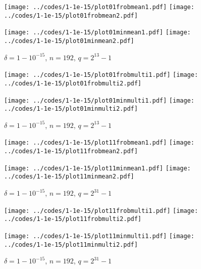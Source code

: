 \documentclass{article}
\begin{document}
\begin{figure}
\begin{centering}
{\texttt{[image: ../codes/1-1e-15/plot01frobmean1.pdf]}}
{\texttt{[image: ../codes/1-1e-15/plot01frobmean2.pdf]}}

{\texttt{[image: ../codes/1-1e-15/plot01minmean1.pdf]}}
{\texttt{[image: ../codes/1-1e-15/plot01minmean2.pdf]}}

\end{centering}
\caption{$\delta = 1-10^{-15}$, $n = 192$, $q = 2^{13} - 1$}
\end{figure}

\begin{figure}
\begin{centering}
{\texttt{[image: ../codes/1-1e-15/plot01frobmulti1.pdf]}}
{\texttt{[image: ../codes/1-1e-15/plot01frobmulti2.pdf]}}

{\texttt{[image: ../codes/1-1e-15/plot01minmulti1.pdf]}}
{\texttt{[image: ../codes/1-1e-15/plot01minmulti2.pdf]}}

\end{centering}
\caption{$\delta = 1-10^{-15}$, $n = 192$, $q = 2^{13} - 1$}
\end{figure}

\begin{figure}
\begin{centering}
{\texttt{[image: ../codes/1-1e-15/plot11frobmean1.pdf]}}
{\texttt{[image: ../codes/1-1e-15/plot11frobmean2.pdf]}}

{\texttt{[image: ../codes/1-1e-15/plot11minmean1.pdf]}}
{\texttt{[image: ../codes/1-1e-15/plot11minmean2.pdf]}}

\end{centering}
\caption{$\delta = 1-10^{-15}$, $n = 192$, $q = 2^{31} - 1$}
\end{figure}

\begin{figure}
\begin{centering}
{\texttt{[image: ../codes/1-1e-15/plot11frobmulti1.pdf]}}
{\texttt{[image: ../codes/1-1e-15/plot11frobmulti2.pdf]}}

{\texttt{[image: ../codes/1-1e-15/plot11minmulti1.pdf]}}
{\texttt{[image: ../codes/1-1e-15/plot11minmulti2.pdf]}}

\end{centering}
\caption{$\delta = 1-10^{-15}$, $n = 192$, $q = 2^{31} - 1$}
\label{pserr1-1e-15-31}
\end{figure}
\end{document}
